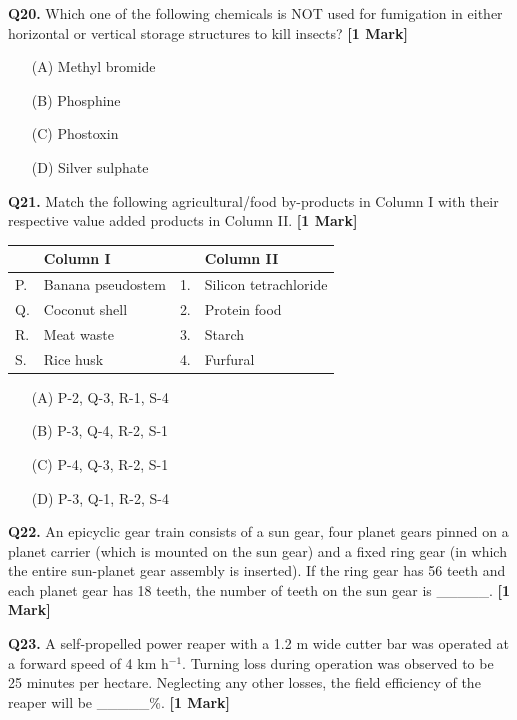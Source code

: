 \documentclass[11pt]{article}
\newcommand{\questiona}[2]{
    \noindent\textbf{Q#2.} #1 \hfill \textbf{[1 Mark]}
}
\begin{document}
\questiona{Which one of the following chemicals is NOT used for fumigation in either horizontal or vertical storage structures to kill insects?}{20}
\begin{enumerate}
    \item[(A)] Methyl bromide  
    \item[(B)] Phosphine  
    \item[(C)] Phostoxin  
    \item[(D)] Silver sulphate  
\end{enumerate}
\vspace{0.5cm}

\questiona{Match the following agricultural/food by-products in Column I with their respective value added products in Column II.}{21}
\begin{center}
\begin{tabular}{|l|l|l|l|}
\hline
 & Column I & & Column II \\
\hline
P. & Banana pseudostem & 1. & Silicon tetrachloride \\
Q. & Coconut shell & 2. & Protein food \\
R. & Meat waste & 3. & Starch \\
S. & Rice husk & 4. & Furfural \\
\hline
\end{tabular}
\end{center}
\begin{enumerate}
    \item[(A)] P-2, Q-3, R-1, S-4  
    \item[(B)] P-3, Q-4, R-2, S-1  
    \item[(C)] P-4, Q-3, R-2, S-1  
    \item[(D)] P-3, Q-1, R-2, S-4  
\end{enumerate}
\vspace{0.5cm}

\questiona{An epicyclic gear train consists of a sun gear, four planet gears pinned on a planet carrier (which is mounted on the sun gear) and a fixed ring gear (in which the entire sun-planet gear assembly is inserted). If the ring gear has 56 teeth and each planet gear has 18 teeth, the number of teeth on the sun gear is \_\_\_\_\_.}{22}
\vspace{0.5cm}

\questiona{A self-propelled power reaper with a 1.2 m wide cutter bar was operated at a forward speed of 4 km h\(^{-1}\). Turning loss during operation was observed to be 25 minutes per hectare. Neglecting any other losses, the field efficiency of the reaper will be \_\_\_\_\_\%.}{23}
\vspace{0.5cm}
\end{document}
